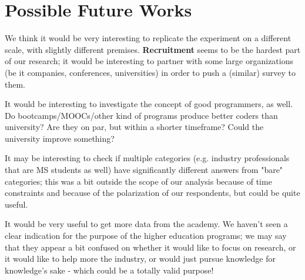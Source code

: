 \documentclass{sigchi}
\begin{document}
\section{Possible Future Works}
We think it would be very interesting to replicate the experiment on a different scale, with slightly different premises. \textbf{Recruitment} seems to be the hardest part of our research; it would be interesting to partner with some large organizations (be it companies, conferences, universities) in order to push a (similar) survey to them.

It would be interesting to investigate the concept of good programmers, as well. Do bootcamps/MOOCs/other kind of programs produce better coders than university? Are they on par, but within a shorter timeframe? Could the university improve something?

It may be interesting to check if multiple categories (e.g. industry professionals that are MS students as well) have significantly different answers from "bare" categories; this was a bit outside the scope of our analysis because of time constraints and because of the polarization of our respondents, but could be quite useful.

It would be very useful to get more data from the academy. We haven't seen a clear indication for the purpose of the higher education programs; we may say that they appear a bit confused on whether it would like to focus on research, or it would like to help more the industry, or would just pursue knowledge for knowledge's sake - which could be a totally valid purpose!





\balance{}

\balance{}



\end{document}
